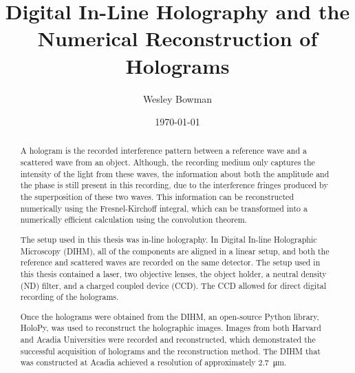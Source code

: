 \documentclass[12pt]{article}
\theoremstyle{definition}
\begin{document}
\title{Digital In-Line Holography and the Numerical Reconstruction of Holograms}
\author{Wesley Bowman}
\date{\today}
\maketitle

\begin{abstract}

    A hologram is the recorded interference pattern between a reference
    wave and a scattered wave from an object. Although, the recording medium only
    captures
    the intensity of the light from these waves, the information about both
    the amplitude and the phase is still present in this recording, due to the
    interference fringes produced by the superposition of these two waves.
    This information can be reconstructed numerically using the
    Fresnel-Kirchoff integral, which can be transformed into a
    numerically efficient calculation using the convolution theorem.

    The setup used in this thesis was in-line holography.
    In Digital In-line Holographic Microscopy (DIHM), all of the components 
    are aligned in a linear setup, and 
    both the reference and scattered waves are
    recorded on the same detector. The setup used in this thesis contained a
    laser, two objective lenses, the object holder, a neutral density (ND) filter, and
    a charged coupled device (CCD). The CCD allowed for direct 
    digital recording of the holograms.

    Once the holograms were obtained from the DIHM, an open-source Python
    library, HoloPy, was used to reconstruct the holographic images. Images
    from both Harvard and Acadia Universities were recorded and reconstructed, which
    demonstrated the successful
    acquisition of holograms and the reconstruction method.
    The DIHM that was constructed at Acadia achieved a resolution of approximately
    \SI{2.7}{\micro\meter}.


\end{abstract}
\end{document}
